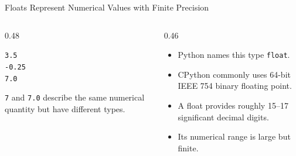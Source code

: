 \documentclass[aspectratio=169,10pt]{beamer}
\begin{document}
\begin{frame}{Floats Represent Numerical Values with Finite Precision}

  \begin{columns}[T,onlytextwidth]

    \begin{column}{0.48\textwidth}

      \begin{center}

        {\Large \texttt{3.5}}\\[0.13in]
        {\Large \texttt{-0.25}}\\[0.13in]
        {\Large \texttt{7.0}}

      \end{center}

      \begin{exampleblockcp}

        \texttt{7} and \texttt{7.0} describe the same numerical quantity but have different types.

      \end{exampleblockcp}

    \end{column}

    \begin{column}{0.46\textwidth}

      \begin{itemize}

        \item Python names this type \texttt{float}.

        \item CPython commonly uses 64-bit IEEE 754 binary floating point.

        \item A float provides roughly 15--17 significant decimal digits.

        \item Its numerical range is large but finite.

      \end{itemize}

    \end{column}

  \end{columns}


\end{frame}
\end{document}
